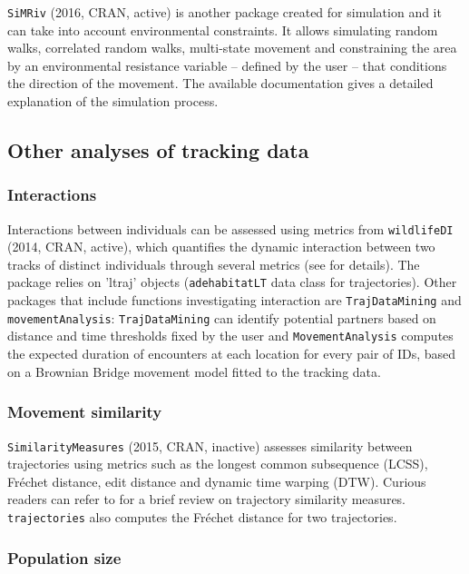 \documentclass[a4paper,12pt]{article}
\newcommand{\Rpkg}[1]{\texttt{#1}}
\begin{document}
\Rpkg{SiMRiv} (2016, CRAN, active) is another package created for simulation and it can take into account environmental constraints. It allows simulating random walks, correlated random walks, multi-state movement and constraining the area by an environmental resistance variable -- defined by the user -- that conditions the direction of the movement. The available documentation gives a detailed explanation of the simulation process. 

\subsection*{Other analyses of tracking data}

\subsubsection*{Interactions}

Interactions between individuals can be assessed using metrics from \Rpkg{wildlifeDI} (2014, CRAN, active), which quantifies the dynamic interaction between two tracks of distinct individuals through several metrics (see \cite{Long2014} for details). The package relies on 'ltraj' objects (\Rpkg{adehabitatLT} data class for trajectories). Other packages that include functions investigating interaction are \Rpkg{TrajDataMining} and \Rpkg{movementAnalysis}: \Rpkg{TrajDataMining} can identify potential partners based on distance and time thresholds fixed by the user and \Rpkg{MovementAnalysis} computes the expected duration of encounters at each location for every pair of IDs, based on a Brownian Bridge movement model fitted to the tracking data. 

\subsubsection*{Movement similarity}

\Rpkg{SimilarityMeasures} (2015, CRAN, inactive) assesses similarity between trajectories using metrics such as the longest common subsequence (LCSS), Fr\'echet distance, edit distance and dynamic time warping (DTW). Curious readers can refer to \cite{Magdy2015} for a brief review on trajectory similarity measures. \Rpkg{trajectories} also computes the Fr\'echet distance for two trajectories. 

\subsubsection*{Population size}
\end{document}
